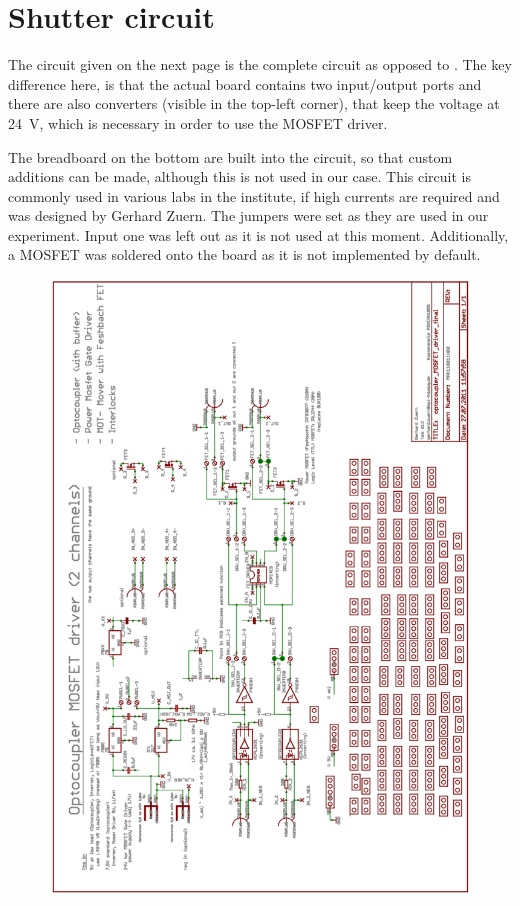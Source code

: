 \chapter{Shutter circuit}
\label{ch:shutter_circuit}
The circuit given on the next page is the complete circuit as opposed to . The key difference here, is that the actual board contains two input/output ports and there are also converters (visible in the top-left corner), that keep the voltage at \SI{24}{\volt}, which is necessary in order to use the MOSFET driver.

The breadboard on the bottom are built into the circuit, so that custom additions can be made, although this is not used in our case. This circuit is commonly used in various labs in the institute, if high currents are required and was designed by Gerhard Zuern. The jumpers were set as they are used in our experiment. Input one was left out as it is not used at this moment. Additionally, a MOSFET was soldered onto the board as it is not implemented by default.

\begin{figure}[htb]
	\begin{center}
		\includegraphics[width=\textwidth]{drafts/shutter_circuit.pdf}
	\end{center}
	\label{fig:cam_drawing}
\end{figure}

